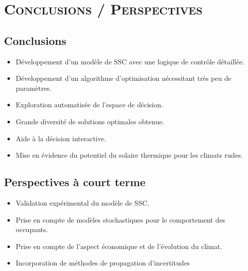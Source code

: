 \documentclass[xcolor=x11names, compress, 11pt]{beamer}
\begin{document}
\section{\scshape Conclusions / Perspectives}


\subsection{Conclusions}
\begin{frame}[c]
    \vfill
    \begin{itemize}
        \item Développement d’un modèle de SSC avec une logique de contrôle détaillée.
        \vfill
        \item Développement d’un algorithme d’optimisation nécessitant très peu de paramètres.
        \vfill
        \item Exploration automatisée de l’espace de décision.
        \vfill
        \item Grande diversité de solutions optimales obtenue.
        \vfill
        \item Aide à la décision interactive.
        \vfill
        \item Mise en évidence du potentiel du solaire thermique pour les climats rudes.
    \end{itemize}
    \vfill
\end{frame}


\subsection{Perspectives à court terme}
\begin{frame}[c]
    \vfill
    \begin{itemize}
        \item Validation expérimental du modèle de SSC.
    \vfill
        \item Prise en compte de modèles stochastiques pour le comportement des occupants.
    \vfill
        \item Prise en compte de l’aspect économique et de l’évolution du climat.
    \vfill
        \item Incorporation de méthodes de propagation d’incertitudes
    \end{itemize}
    \vfill
\end{frame}
\end{document}
